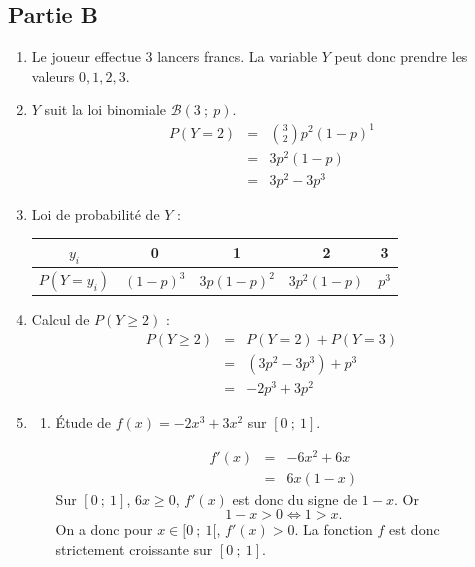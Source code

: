 \documentclass[10pt]{article}
\begin{document}
\subsection*{Partie B}
\begin{enumerate}
\item Le joueur effectue 3 lancers francs. La variable $Y$ peut donc prendre les valeurs $0, 1, 2, 3$.

\item $Y$ suit la loi binomiale $\mathcal{B}(3~;~p)$.
\[
\begin{array}{rcl}
P(Y = 2) &=& \binom{3}{2} p^2 (1 - p)^1 \\
&=& 3p^2(1 - p) \\
&=& 3p^2 - 3p^3
\end{array}
\]

\item Loi de probabilité de $Y$ :
\begin{center}
\renewcommand{\arraystretch}{1.5}
\begin{tabular}{|c|c|c|c|c|}
\hline
$y_i$ & 0 & 1 & 2 & 3 \\
\hline
$P(Y = y_i)$ & $(1 - p)^3$ & $3p(1 - p)^2$ & $3p^2(1 - p)$ & $p^3$ \\
\hline
\end{tabular}
\end{center}

\item Calcul de $P(Y \geqslant 2)$ :
\[
\begin{array}{rcl}
P(Y \geqslant 2) &=& P(Y = 2) + P(Y = 3) \\
&=& (3p^2 - 3p^3) + p^3 \\
&=& -2p^3 + 3p^2
\end{array}
\]

\item
\begin{enumerate}
\item Étude de $f(x) = -2x^3 + 3x^2$ sur $[0~;~1]$.

\[\begin{array}{rcl}
f'(x) &=& -6x^2 + 6x \\
&=& 6x(1 - x)
\end{array}\]
Sur $[0~;~1]$, $6x \geqslant 0$, $f'(x)$ est donc du signe de  $1 - x $. Or \[1 - x > 0 \iff 1 >x.\] On a donc pour $x \in [0~;~1[$,\: $f'(x) > 0$. La fonction $f$ est donc strictement croissante sur $[0~;~1]$.

\begin{center}
\end{center}


\end{enumerate}
\end{enumerate}
\end{document}
